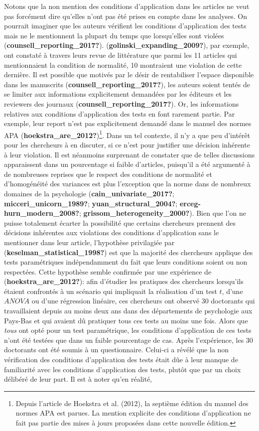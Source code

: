 \documentclass[
  english,
  man]{apa6}
\begin{document}
Notons que la non mention des conditions d'application dans les articles ne veut pas forcément dire qu'elles n'ont pas été prises en compte dans les analyses. On pourrait imaginer que les auteurs vérifient les conditions d'application des tests mais ne le mentionnent la plupart du temps que lorsqu'elles sont violées (\textbf{counsell\_reporting\_2017?}). (\textbf{golinski\_expanding\_2009?}), par exemple, ont constaté à travers leurs revue de littérature que parmi les 11 articles qui mentionnaient la condition de normalité, 10 montraient une violation de cette dernière. Il est possible que motivés par le désir de rentabiliser l'espace disponible dans les manuscrits (\textbf{counsell\_reporting\_2017?}), les auteurs soient tentés de se limiter aux informations explicitement demandées par les éditeurs et les reviewers des journaux (\textbf{counsell\_reporting\_2017?}). Or, les informations relatives aux conditions d'application des tests en font rarement partie. Par exemple, leur report n'est pas explicitement demandé dans le manuel des normes APA (\textbf{hoekstra\_are\_2012?})\footnote{Depuis l'article de Hoekstra et al. (2012), la septième édition du manuel des normes APA est parues. La mention explicite des conditions d'application ne fait pas partie des mises à jours proposées dans cette nouvelle édition.}. Dans un tel contexte, il n'y a que peu d'intérêt pour les chercheurs à en discuter, si ce n'est pour justifier une décision inhérente à leur violation. Il est néanmoins surprenant de constater que de telles discussions apparaissent dans un pourcentage si faible d'articles, puisqu'il a été argumenté à de nombreuses reprises que le respect des conditions de normalité et d'homogénéité des variances est plus l'exception que la norme dans de nombreux domaines de la psychologie (\textbf{cain\_univariate\_2017?}; \textbf{micceri\_unicorn\_1989?}; \textbf{yuan\_structural\_2004?}; \textbf{erceg-hurn\_modern\_2008?}; \textbf{grissom\_heterogeneity\_2000?}). Bien que l'on ne puisse totalement écarter la possibilité que certains chercheurs prennent des décisions inhérentes aux violations des conditions d'application sans le mentionner dans leur article, l'hypothèse privilagiée par (\textbf{keselman\_statistical\_1998?}) est que la majorité des chercheurs applique des tests paramétriques indépendamment du fait que leurs conditions soient ou non respectées. Cette hypothèse semble confirmée par une expérience de (\textbf{hoekstra\_are\_2012?}): afin d'étudier les pratiques des chercheurs lorsqu'ils étaient confrontés à un scénario qui impliquait la réalisation d'un test \(t\), d'une \(ANOVA\) ou d'une régression linéaire, ces chercheurs ont observé 30 doctorants qui travaillaient depuis au moins deux ans dans des départements de psychologie aux Pays-Bas et qui avaient dû pratiquer tous ces tests au moins une fois. Alors que \emph{tous} ont opté pour un test paramétrique, les conditions d'application de ces tests n'ont été testées que dans un faible pourcentage de cas. Après l'expérience, les 30 doctorants ont été soumis à un questionnaire. Celui-ci a révélé que la non vérification des conditions d'application des tests était dûe à leur manque de familiarité avec les conditions d'application des tests, plutôt que par un choix délibéré de leur part. Il est à noter qu'en réalité, 
\end{document}
